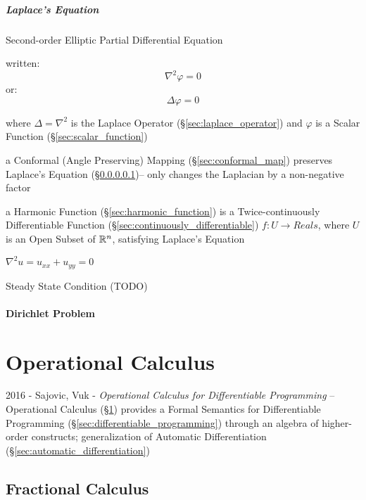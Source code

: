 \subparagraph{Laplace's Equation}\label{sec:laplaces_equation}\hfill

Second-order Elliptic Partial Differential Equation

written:
\[ \nabla^2 \varphi = 0 \]
or:
\[ \Delta \varphi = 0 \]

where $\Delta = \nabla^2$ is the Laplace Operator
(\S\ref{sec:laplace_operator}) and $\varphi$ is a Scalar Function
(\S\ref{sec:scalar_function})

a Conformal (Angle Preserving) Mapping (\S\ref{sec:conformal_map}) preserves
Laplace's Equation (\S\ref{sec:laplaces_equation})-- only changes the Laplacian
by a non-negative factor

a Harmonic Function (\S\ref{sec:harmonic_function}) is a Twice-continuously
Differentiable Function (\S\ref{sec:continuously_differentiable}) $f : U
\rightarrow Reals$, where $U$ is an Open Subset of $\mathbb{R}^n$, satisfying
Laplace's Equation

$\nabla^2 u = u_{xx} + u_{yy} = 0$ %

Steady State Condition (TODO)



\paragraph{Dirichlet Problem}\label{sec:dirichlet_problem}\hfill



\section{Operational Calculus}\label{sec:operational_calculus}

2016 - Sajovic, Vuk - \emph{Operational Calculus for Differentiable Programming}
-- Operational Calculus (\S\ref{sec:operational_calculus}) provides a Formal
Semantics for Differentiable Programming
(\S\ref{sec:differentiable_programming}) through an algebra of higher-order
constructs; generalization of Automatic Differentiation
(\S\ref{sec:automatic_differentiation})



\subsection{Fractional Calculus}\label{sec:fractional_calculus}



